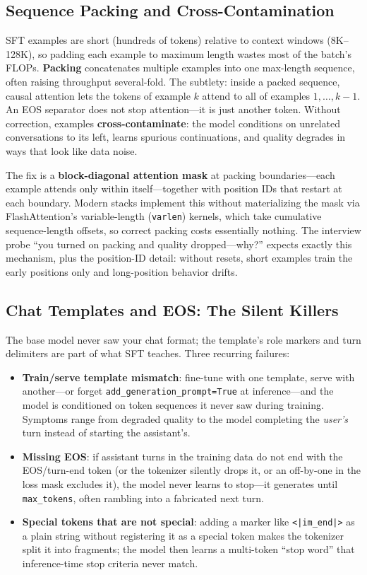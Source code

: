 \subsection{Sequence Packing and Cross-Contamination}

SFT examples are short (hundreds of tokens) relative to context windows (8K--128K), so padding each example to maximum length wastes most of the batch's FLOPs. \textbf{Packing} concatenates multiple examples into one max-length sequence, often raising throughput several-fold. The subtlety: inside a packed sequence, causal attention lets the tokens of example $k$ attend to all of examples $1, \ldots, k-1$. An EOS separator does not stop attention---it is just another token. Without correction, examples \textbf{cross-contaminate}: the model conditions on unrelated conversations to its left, learns spurious continuations, and quality degrades in ways that look like data noise.

The fix is a \textbf{block-diagonal attention mask} at packing boundaries---each example attends only within itself---together with position IDs that restart at each boundary. Modern stacks implement this without materializing the mask via FlashAttention's variable-length (\texttt{varlen}) kernels, which take cumulative sequence-length offsets, so correct packing costs essentially nothing. The interview probe ``you turned on packing and quality dropped---why?'' expects exactly this mechanism, plus the position-ID detail: without resets, short examples train the early positions only and long-position behavior drifts.

\subsection{Chat Templates and EOS: The Silent Killers}

The base model never saw your chat format; the template's role markers and turn delimiters are part of what SFT teaches. Three recurring failures:

\begin{itemize}
    \item \textbf{Train/serve template mismatch}: fine-tune with one template, serve with another---or forget \texttt{add\_generation\_prompt=True} at inference---and the model is conditioned on token sequences it never saw during training. Symptoms range from degraded quality to the model completing the \emph{user's} turn instead of starting the assistant's.
    \item \textbf{Missing EOS}: if assistant turns in the training data do not end with the EOS/turn-end token (or the tokenizer silently drops it, or an off-by-one in the loss mask excludes it), the model never learns to stop---it generates until \texttt{max\_tokens}, often rambling into a fabricated next turn.
    \item \textbf{Special tokens that are not special}: adding a marker like \texttt{<|im\_end|>} as a plain string without registering it as a special token makes the tokenizer split it into fragments; the model then learns a multi-token ``stop word'' that inference-time stop criteria never match.
\end{itemize}

